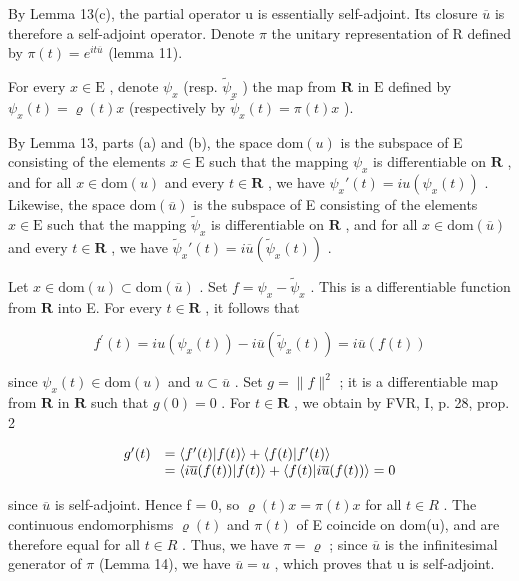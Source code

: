 By Lemma 13(c), the partial operator u is essentially self-adjoint. Its closure \(\overline{u}\) is therefore a self-adjoint operator. Denote \(\pi\) the unitary representation of R defined by \(\pi(t) = e^{it\overline{u}}\) (lemma 11).

For every \(x \in \mathrm{E}\) , denote \(\psi_x\) (resp. \(\widetilde{\psi}_x\) ) the map from \(\mathbf{R}\) in \(\mathrm{E}\) defined by \(\psi_x(t) = \varrho(t)x\) (respectively by \(\widetilde{\psi}_x(t) = \pi(t)x\) ).

By Lemma 13, parts (a) and (b), the space \(\mathrm{dom}(u)\) is the subspace of E consisting of the elements \(x \in \mathrm{E}\) such that the mapping \(\psi_x\) is differentiable on \(\mathbf{R}\) , and for all \(x \in \mathrm{dom}(u)\) and every \(t \in \mathbf{R}\) , we have \(\psi_x'(t) = i u (\psi_x(t))\) . Likewise, the space \(\mathrm{dom}(\overline{u})\) is the subspace of E consisting of the elements \(x \in \mathrm{E}\) such that the mapping \(\widetilde{\psi}_x\) is differentiable on \(\mathbf{R}\) , and for all \(x \in \mathrm{dom}(\overline{u})\) and every \(t \in \mathbf{R}\) , we have \(\widetilde{\psi}_x'(t) = i \overline{u} (\widetilde{\psi}_x(t))\) .

Let \(x \in \text{dom}(u) \subset \text{dom}(\overline{u})\) . Set \(f = \psi_x - \widetilde{\psi}_x\) . This is a differentiable function from \(\mathbf{R}\) into E. For every \(t \in \mathbf{R}\) , it follows that

\[
f ^ {\prime} (t) = i u (\psi_ {x} (t)) - i \overline {{u}} (\widetilde {\psi} _ {x} (t)) = i \overline {{u}} (f (t))
\]

since \(\psi_x(t) \in \mathrm{dom}(u)\) and \(u \subset \overline{u}\) . Set \(g = \|f\|^2\) ; it is a differentiable map from \(\mathbf{R}\) in \(\mathbf{R}\) such that \(g(0) = 0\) . For \(t \in \mathbf{R}\) , we obtain by FVR, I, p. 28, prop. 2

\[
\begin{array}{r l} g ^ {\prime} (t) & = \langle f ^ {\prime} (t) | f (t) \rangle + \langle f (t) | f ^ {\prime} (t) \rangle \\ & = \langle i \overline {{u}} (f (t)) | f (t) \rangle + \langle f (t) | i \overline {{u}} (f (t)) \rangle = 0 \end{array}
\]

since \(\overline{u}\) is self-adjoint. Hence f = 0, so \(\varrho(t)x = \pi(t)x\) for all \(t \in R\) . The continuous endomorphisms \(\varrho(t)\) and \(\pi(t)\) of E coincide on dom(u), and are therefore equal for all \(t \in R\) . Thus, we have \(\pi = \varrho\) ; since \(\overline{u}\) is the infinitesimal generator of \(\pi\) (Lemma 14), we have \(\overline{u} = u\) , which proves that u is self-adjoint.

